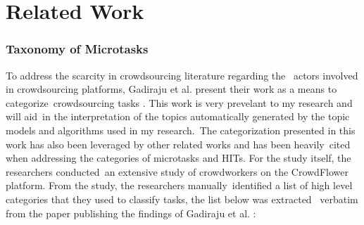 \documentclass[letterpaper,12pt]{article}
\begin{document}
\chapter{Related Work}

\subsection{Taxonomy of Microtasks} To address the scarcity in crowdsourcing literature regarding the \
actors involved in crowdsourcing platforms, Gadiraju et al. present their work as a means to categorize\
crowdsourcing tasks \cite{gadiraju2014taxonomy}. This work is very prevelant to my research and will aid\
in the interpretation of the topics automatically generated by the topic models and algorithms used in my research.\
The categorization presented in this work has also been leveraged by other related works and has been heavily\
cited when addressing the categories of microtasks and HITs. For the study itself, the researchers conducted\
an extensive study of crowdworkers on the CrowdFlower platform. From the study, the researchers manually\
identified a list of high level categories that they used to classify tasks, the list below was extracted \
verbatim from the paper publishing the findings of Gadiraju et al. \cite{gadiraju2014taxonomy}: 
\end{document}
